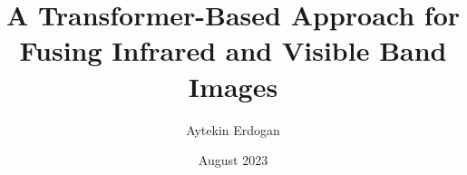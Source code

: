 \documentclass[chaparabic,mmi,ms,12pt,single]{metu}
\author{Aytekin Erdogan} %
\title{A Transformer-Based Approach for Fusing Infrared and Visible Band Images} %
\date{August 2023} %
\begin{document}
\begin{preliminaries}


\end{preliminaries}
%   
% 
%

\setlength{\parindent}{0em}
\setlength{\parskip}{10pt}











%
%

%

% 

% 
% 
% 
%
\end{document}
